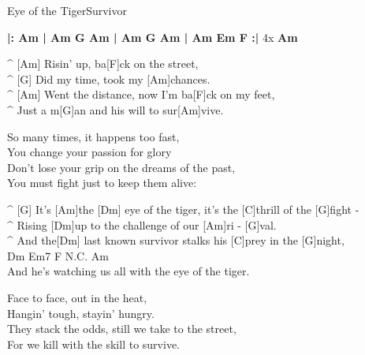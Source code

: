 \begin{song}{Eye of the Tiger}{Survivor}


\begin{guitar}
\textbf{|: Am | Am G Am | Am G Am | Am Em F :|} 4x  \textbf{Am}\\
\end{guitar}

\begin{guitar}
^ [Am]   Risin' up, ba[F]ck on the street,\\
^ [G]  Did my time, took my [Am]chances.\\
^ [Am]  Went the distance, now I'm ba[F]ck on my feet,\\
^ Just a m[G]an and his will to sur[Am]vive.\\
\end{guitar}

\begin{guitar}
So many times, it happens too fast,\\
You change your passion for glory\\
Don't lose your grip on the dreams of the past,\\
You must fight just to keep them alive:\\
\end{guitar}


\begin{guitar}
^ [G] It's [Am]the [Dm]  eye of the tiger, it's the [C]thrill of the [G]fight -\\
^ Rising [Dm]up to the challenge of our [Am]ri - [G]val.\\
^ And the[Dm] last known survivor stalks his [C]prey in the [G]night,\\
         Dm          Em7          F  N.C.    Am\\
And he's watching us all with the eye of the tiger.\\
\end{guitar}

\begin{guitar}
Face to face, out in the heat,\\
Hangin' tough, stayin' hungry.\\
They stack the odds, still we take to the street,\\
For we kill with the skill to survive.\\
\end{guitar}


\end{song}
